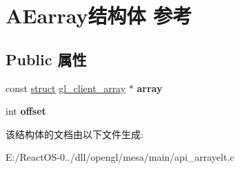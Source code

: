 \hypertarget{struct_a_earray}{}\section{A\+Earray结构体 参考}
\label{struct_a_earray}
\subsection*{Public 属性}
\begin{DoxyCompactItemize}
\item 
\mbox{\label{struct_a_earray_a32e24dbf350eb0c467535248fd3e5ef2}} 
const \hyperlink{interfacestruct}{struct} \hyperlink{structgl__client__array}{gl\+\_\+client\+\_\+array} $\ast$ {\bfseries array}
\item 
\mbox{\label{struct_a_earray_acd4b6b33c3eacc4fece83651be7c8142}} 
int {\bfseries offset}
\end{DoxyCompactItemize}


该结构体的文档由以下文件生成\+:\begin{DoxyCompactItemize}
\item 
E\+:/\+React\+O\+S-\/0../dll/opengl/mesa/main/api\+\_\+arrayelt.\+c\end{DoxyCompactItemize}
